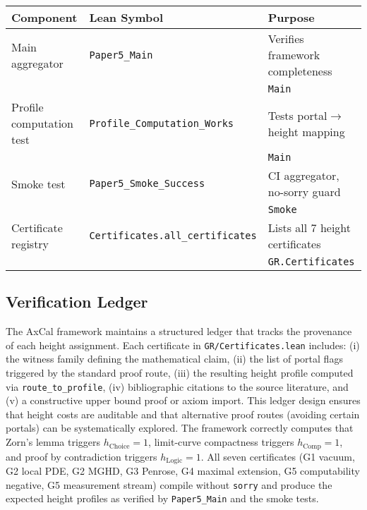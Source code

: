 \documentclass[11pt]{article}
\theoremstyle{definition}
\theoremstyle{remark}
\newcommand{\hChoice}{h_{\mathrm{Choice}}}    %
\newcommand{\hComp}{h_{\mathrm{Comp}}}        %
\newcommand{\hLogic}{h_{\mathrm{Logic}}}      %
\begin{document}
\begin{center}
\small
\begin{tabular}{|p{4cm}|p{5cm}|p{5.5cm}|}
\hline
\textbf{Component} & \textbf{Lean Symbol} & \textbf{Purpose} \\
\hline
Main aggregator & \texttt{Paper5\_Main} & Verifies framework completeness \\
& & \texttt{Main} \\
\hline
Profile computation test & \texttt{Profile\_Computation\_Works} & Tests portal$\to$height mapping \\
& & \texttt{Main} \\
\hline
Smoke test & \texttt{Paper5\_Smoke\_Success} & CI aggregator, no-sorry guard \\
& & \texttt{Smoke} \\
\hline
Certificate registry & \texttt{Certificates.all\_certificates} & Lists all 7 height certificates \\
& & \texttt{GR.Certificates} \\
\hline
\end{tabular}
\end{center}

\subsection{Verification Ledger}

The AxCal framework maintains a structured ledger that tracks the provenance of each height assignment. Each certificate in \texttt{GR/Certificates.lean} includes: (i) the witness family defining the mathematical claim, (ii) the list of portal flags triggered by the standard proof route, (iii) the resulting height profile computed via \texttt{route\_to\_profile}, (iv) bibliographic citations to the source literature, and (v) a constructive upper bound proof or axiom import. This ledger design ensures that height costs are auditable and that alternative proof routes (avoiding certain portals) can be systematically explored. The framework correctly computes that Zorn's lemma triggers $\hChoice = 1$, limit-curve compactness triggers $\hComp = 1$, and proof by contradiction triggers $\hLogic = 1$. All seven certificates (G1 vacuum, G2 local PDE, G2 MGHD, G3 Penrose, G4 maximal extension, G5 computability negative, G5 measurement stream) compile without \texttt{sorry} and produce the expected height profiles as verified by \texttt{Paper5\_Main} and the smoke tests.

\end{document}
